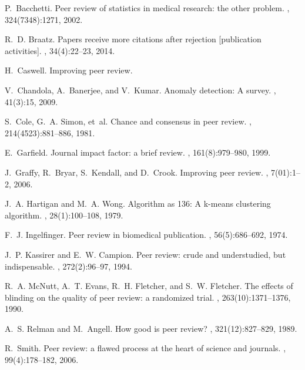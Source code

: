 %
%

\begin{thebibliography}{10}

P.~Bacchetti.
\newblock Peer review of statistics in medical research: the other problem.
, 324(7348):1271, 2002.

R.~D. Braatz.
\newblock Papers receive more citations after rejection [publication
  activities].
, 34(4):22--23, 2014.

H.~Caswell.
\newblock Improving peer review.

V.~Chandola, A.~Banerjee, and V.~Kumar.
\newblock Anomaly detection: A survey.
, 41(3):15, 2009.

S.~Cole, G.~A. Simon, et~al.
\newblock Chance and consensus in peer review.
, 214(4523):881--886, 1981.

E.~Garfield.
\newblock Journal impact factor: a brief review.
, 161(8):979--980, 1999.

J.~Graffy, R.~Bryar, S.~Kendall, and D.~Crook.
\newblock Improving peer review.
, 7(01):1--2, 2006.

J.~A. Hartigan and M.~A. Wong.
\newblock Algorithm as 136: A k-means clustering algorithm.
, 28(1):100--108, 1979.

F.~J. Ingelfinger.
\newblock Peer review in biomedical publication.
, 56(5):686--692, 1974.

J.~P. Kassirer and E.~W. Campion.
\newblock Peer review: crude and understudied, but indispensable.
, 272(2):96--97, 1994.

R.~A. McNutt, A.~T. Evans, R.~H. Fletcher, and S.~W. Fletcher.
\newblock The effects of blinding on the quality of peer review: a randomized
  trial.
, 263(10):1371--1376, 1990.

A.~S. Relman and M.~Angell.
\newblock How good is peer review?
, 321(12):827--829, 1989.

R.~Smith.
\newblock Peer review: a flawed process at the heart of science and journals.
, 99(4):178--182, 2006.

\end{thebibliography}


\fi